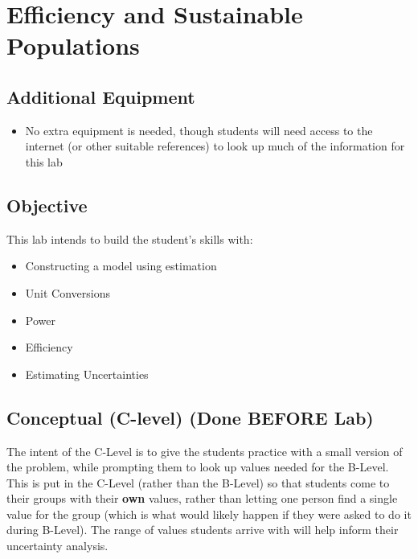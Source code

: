 \documentclass[fleqn,letterpaper]{article}
\begin{document}
\cfoot{}
\headsep=25pt

\section*{Efficiency and Sustainable Populations}

\subsection*{Additional Equipment}

\begin{itemize}
  \item{No extra equipment is needed, though students will need access to the internet (or other suitable references) to look up much of the information for this lab}
\end{itemize}

\subsection*{Objective}

This lab intends to build the student's skills with:
%
\begin{itemize}
 \item{Constructing a model using estimation}
 \item{Unit Conversions}
 \item{Power}
 \item{Efficiency}
 \item{Estimating Uncertainties}
\end{itemize}
%

\subsection*{Conceptual (C-level) (Done BEFORE Lab)}

The intent of the C-Level is to give the students practice with a small version of the problem, while prompting them to look up values needed for the B-Level.  This is put in the C-Level (rather than the B-Level) so that students come to their groups with their \textbf{own} values, rather than letting one person find a single value for the group (which is what would likely happen if they were asked to do it during B-Level).  The range of values students arrive with will help inform their uncertainty analysis.
\end{document}
